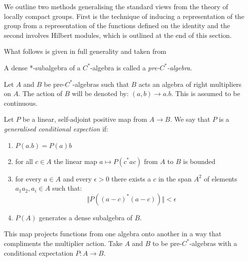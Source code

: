 We outline two methods generalising the standard views from the theory of locally compact groups. First is the technique of inducing a representation of the group from a representation of the functions defined on the identity and the second involves Hilbert modules, which is outlined at the end of this section.

What follows is given in full generality and taken from \cite[Appendix D]{MR1724106}
\begin{definition}
A dense *-subalgebra of a $C^{*}$-algebra is called a \textit{pre-$C^{*}$-algebra}.
\end{definition}

Let $A$ and $B$ be pre-$C^{*}$-algebras such that $B$ acts an algebra of right multipliers on $A$. The action of $B$ will be denoted by: $(a,b) \rightarrow a.b$. This is assumed to be continuous. 

\begin{definition}
Let $P$ be a linear, self-adjoint positive map from $A \rightarrow B$. We say that $P$ is a \textit{generalised conditional expection} if:
\begin{enumerate}
\item $P(a.b)=P(a)b$
\item for all $c \in A$ the linear map $a \mapsto P(c^{*}ac)$ from $A$ to $B$ is bounded
\item for every $a\in A$ and every $\epsilon > 0 $ there exists a $c$ in the span $A^{2}$ of elements $a_{1}a_{2}, a_{i} \in A$ such that:
\begin{equation*}
\Vert P((a-c)^{*}(a-c))\Vert < \epsilon
\end{equation*}
\item $P(A)$ generates a dense subalgebra of $B$.
\end{enumerate}
\end{definition}

This map projects functions from one algebra onto another in a way that compliments the multiplier action. Take $A$ and $B$ to be pre-$C^{*}$-algebras with a conditional expectation $P: A \rightarrow B$.

